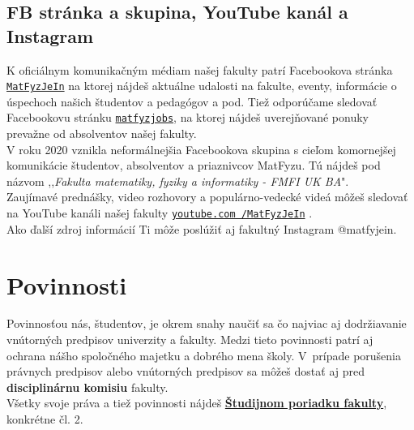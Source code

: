 \subsection{FB stránka a skupina, YouTube kanál a Instagram}


K oficiálnym komunikačným médiam našej fakulty patrí Facebookova stránka \href{https://www.facebook.com/MatFyzJeIn/}{\texttt{MatFyzJeIn}} na ktorej nájdeš aktuálne udalosti na fakulte, eventy, informácie o úspechoch našich študentov a pedagógov a pod. Tiež odporúčame sledovať Facebookovu stránku \href{https://www.facebook.com/matfyzjobs/}{\texttt{matfyzjobs}}, na ktorej nájdeš uverejňované ponuky prevažne od absolventov našej fakulty.\\ 

V roku 2020 vznikla neformálnejšia Facebookova skupina s cieľom komornejšej komunikácie študentov, absolventov a priaznivcov MatFyzu. Tú nájdeš pod názvom ,,\emph{Fakulta matematiky, fyziky a informatiky - FMFI UK BA}". \\

Zaujímavé prednášky, video rozhovory a populárno-vedecké videá môžeš sledovať na YouTube
kanáli našej fakulty {\href{http://www.youtube.com/MatFyzJeIn}{\texttt{youtube.com\ /MatFyzJeIn}}%
}. \\

Ako ďalší zdroj informácií Ti môže poslúžiť aj fakultný Instagram @matfyjein. 



\section{Povinnosti}

Povinnosťou nás, študentov, je okrem snahy naučiť sa čo najviac aj
dodržiavanie vnútorných predpisov univerzity a fakulty. Medzi tieto
povinnosti patrí aj ochrana nášho spoločného majetku a dobrého mena
školy. V~prípade porušenia právnych predpisov alebo vnútorných predpisov
sa môžeš dostať aj pred \textbf{disciplinárnu komisiu} fakulty.\\

Všetky svoje práva a tiež povinnosti nájdeš \textbf{\href{https://zona.fmph.uniba.sk/fileadmin/fmfi/fakulta/legislativa/Studijny_poriadok_FMFI_UK_maj2020.pdf}{Študijnom poriadku fakulty}}, konkrétne čl. 2.
